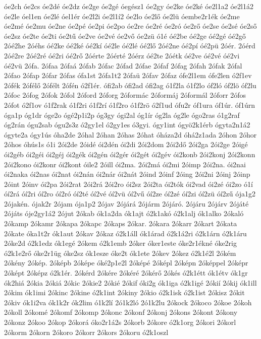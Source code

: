 {óe2ch
óe2cs
óe2dé
óe2dz
óe2ge
óe2gé
óegész1
óe2gy
óe2ke
óe2ké
óe2l1a2
óe2l1á2
óe2le
óel1en
óe2lé
óel1ér
óe2l2i
óe2l1í2
óe2lo
óe2lő
óe2lü
óembe2r1ék
óe2me
óe2mé
óe2mu
óe2ne
óe2pé
óe2pi
óe2po
óe2re
óe2ré
óe2ró
óe2rő
óe2se
óe2sé
óe2ső
óe2sz
óe2te
óe2ti
óe2tű
óe2ve
óe2vé
óe2vő
óe2zü
ó1é
óé2be
óé2ge
óé2gé
óé2gő
2óé2he
2óéhs
óé2ke
óé2ké
óé2kí
óé2le
óé2lé
óé2lő
2óé2ne
óé2pí
óé2pü
2óér.
2óérd
2óé2re
2óé2ré
óé2ri
óé2rő
2óérte
2óérté
2óérz
óé2te
2óétk
óé2ve
óé2vé
óé2vi
óé2vü
2ófa.
2ófaa
2ófaá
2ófab
2ófac
2ófad
2ófae
2ófaf
2ófag
2ófah
2ófak
2ófal
2ófao
2ófap
2ófar
2ófas
ófa1st
2ófa1t2
2ófaü
2ófav
2ófaz
ófe2l1em
ófe2len
ó2f1ev
2ófék
2ófélő
2ófélt
2ófén
ó2f1ér.
ófi2ab
ófi2ad
ófi2ag
ó1f2la
ó1f2lo
óf2ló
óf2lö
óf2lu
2ófoc
2ófog
2ófok
2ófol
2óford
2óforg
2óformác
2óformáj
2óformál
2óforr
2ófos
2ófot
ó2f1ov
ó1f2rak
ó1f2ri
ó1f2rí
ó1f2ro
ó1f2rö
ó2f1ud
ófu2r
óf1ura
óf1úr.
óf1úrn
óga1p
óg1dr
óge2o
ógé2p1i2p
óg3gy
ógi2al
óg1ír
óg2la
óg2le
ógo2ras
ó1g2raf
óg2rán
ógu2sab
ógu2s3z
ó2gy1el
ó2gy1es
ó3gyi.
ógy1int
ógyö2k1érb
ógyta2n1á2
ógyte2a
ógy1ús
óha2de
2óhal
2óhan
2óhas
2óhat
óháza2d
óhá2z1ada
2óhon
2óhor
2óhos
óhús1s
ó1i
2ói2de
2óidé
ói2dén
ói2di
2ói2dom
2ói2dő
2ói2ga
2ói2ge
2óigé
ói2géb
ói2géi
ói2géj
ói2gék
ói2gén
ói2gér
ói2gét
ói2gév
ói2konb
2ói2konj
2ói2konn
2ói2kono
ói2konr
ói2kont
óile2
2óill
ói2ma.
2ói2má
ói2mi
2óimp
2ói2na.
ói2nai
ói2naka
ói2nas
ói2nat
ói2nán
ói2nár
ói2nát
2óind
2óinf
2óing
2ói2ni
2óinj
2óinp
2óint
2óinv
ói2pa
2ói2rat
2ói2rá
2ói2ro
ói2sz
2ói2ta
ói2tók
ói2vad
ói2zé
ói2zo
ó1í
óí2rá
óí2ri
óí2ro
óí2ró
óí2té
óí2vé
óí2vü
óí2vű
óí2ze
óí2zé
óí2zi
óí2zü
óí2zű
ója1g2
2ójakén.
ójak2r
2ójam
ója1p2
2ójav
2ójárá
2ójárm
2ójáró.
2ójáru
2ójárv
2ójáté
2ójáts
óje2gy1á2
2ójut
2ókab
ók1a2da
ók1ajt
ó2k1akó
ó2k1alj
ók1alko
2ókaló
2ókamp
2ókamr
2ókapa
2ókapc
2ókaps
2ókar.
2ókara
2ókarr
2ókart
2ókata
2ókate
óka1t2r
ók1aut
2ókav
2ókaz
ó2k1áll
ók1árad
ó2k1á2ri
ó2k1árn
ó2k1áru
2óke2d
ó2k1edz
ók1egé
2ókem
ó2k1emb
2óker
óker1este
óke2r1ékné
óke2rig
ó2k1e2rő
óke2r1üg
óke2sz
ók1esze
óke2t
ók1ete
2ókev
2ókez
ó2k1é2l
2ókém
2ókény
2ókép.
2óképb
2óképe
óké2p1e2l
2óképé
2óképl
2óképn
2óképpel
2óképr
2óképt
2óképz
ó2k1ér.
2ókérd
2ókére
2ókéré
2ókérő
2ókés
ó2k1étt
ók1étv
ók1gr
ók2hiá
2ókia
2ókiá
2ókic
2ókie2
2ókié
2ókif
óki2g
ók1iga
ó2k1igé
2ókií
2ókij
ók1ill
2ókim
ók1imi
2ókinc
2ókine
ó2k1int
2ókiny
2ókio
ó2k1isk
ó2k1ist
2ókisz
2ókit
2ókiv
ók1i2va
ók1k2r
ók2lim
ó1k2lí
2ó1k2ló
2ó1k2lu
2ókock
2ókoco
2ókoe
2ókoh
2ókoll
2ókomé
2ókomf
2ókomp
2ókonc
2ókonf
2ókonj
2ókons
2ókont
2ókony
2ókonz
2ókoo
2ókop
2ókorá
óko2r1á2s
2ókorb
2ókore
ó2k1org
2ókori
2ókorl
2ókorm
2ókorn
2ókoro
2ókorr
2ókors
2ókoru
ó2k1oszl
}
